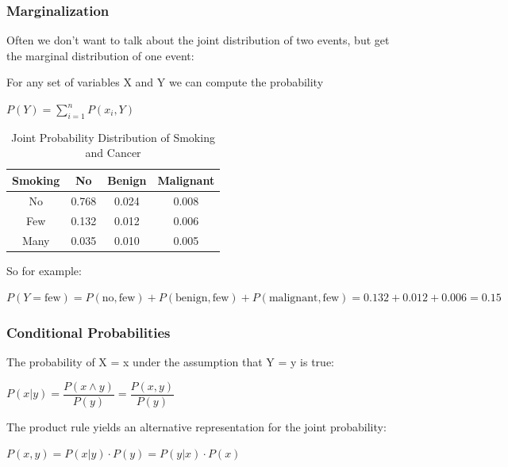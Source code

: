 \documentclass[
../EiKI_Summary.tex,
]
{subfiles}
\begin{document}
\subsubsection{Marginalization}
Often we don't want to talk about the joint distribution of two events, but get the marginal distribution of one event: 

For any set of variables X and Y we can compute the probability 

\begin{csmb*}
    $\displaystyle P(Y) = \sum_{i=1}^{n} P(x_i,Y)$
\end{csmb*}

\begin{table}[H]
    \centering
    \renewcommand{\arraystretch}{1.3}
    \begin{tabular}{|c|ccc|}
        \hline
        \textbf{Smoking} & \textbf{No} & \textbf{Benign} & \textbf{Malignant} \\
        \hline
        No   & 0.768  & 0.024  & 0.008  \\
        Few  & 0.132  & 0.012  & 0.006  \\
        Many & 0.035  & 0.010  & 0.005  \\
        \hline
    \end{tabular}
    \caption{Joint Probability Distribution of Smoking and Cancer}
\end{table}

So for example:

\begin{csmb*}
    $P(Y = \text{few}) = P(\text{no}, \text{few}) + P(\text{benign}, \text{few}) + P(\text{malignant}, \text{few}) = 0.132 + 0.012 + 0.006 = 0.15$
\end{csmb*}

\subsubsection{Conditional Probabilities}
The probability of X = x under the assumption that Y = y is true:

\begin{csmb*}
    $P(x|y) = \dfrac{P(x \land y)}{P(y)} = \dfrac{P(x,y)}{P(y)}$
\end{csmb*}

The product rule yields an alternative representation for the joint probability:

\begin{csmb*}
    $P(x,y) = P(x|y) \cdot P(y) = P(y|x) \cdot P(x)$
\end{csmb*}
\end{document}
